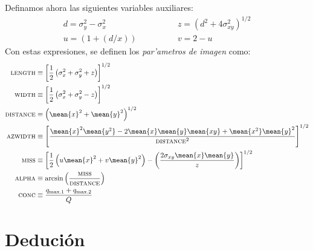 Definamos ahora las siguientes variables auxiliares:
%
\begin{equation}
\label{eq:auxiliary}
\begin{split}
  d = \sigma_y^2 - \sigma_x^2 &\qquad\qquad
  z = \left(d^2+4\sigma_{xy}^2\right)^{1/2} \\
  u = \left(1+(d/x)\right) &\qquad\qquad
  v = 2 - u
\end{split}
\end{equation}
Con estas expresiones, se definen los \emph{par'ametros de imagen}
como:
%
\begin{subequations}
  \label{eq:imageparams}
  \begin{align}
%
    \label{eq:lengthdef}
    \text{\scshape length} &\equiv 
    \left[\frac{1}{2}\left(\sigma_x^2+\sigma_y^2+z\right)\right]^{1/2}\\
%
    \label{eq:widthdef}
    \text{\scshape width} &\equiv 
    \left[\frac{1}{2}\left(\sigma_x^2+\sigma_y^2-z\right)\right]^{1/2}\\
%
    \label{eq:distdef}
    \text{\scshape distance} &\equiv 
    \left(\mean{x}^2 + \mean{y}^2\right)^{1/2}\\
%
    \label{eq:azwidthdef}
    \text{\scshape azwidth} &\equiv 
    \left[\frac{\mean{x}^2\mean{y^2} 
        - 2\mean{x}\mean{y}\mean{xy} 
        + \mean{x^2}\mean{y}^2}{\text{\scshape distance}^2}\right]^{1/2}\\
%
    \label{eq:missdef}
    \text{\scshape miss} &\equiv 
    \left[\frac{1}{2}\left(u\mean{x}^2 + v\mean{y}^2\right)
        - \left(\frac{2\sigma_{xy}\mean{x}\mean{y}}{z}\right)\right]^{1/2}\\
%
    \label{eq:alphadef}
    \text{\scshape alpha} &\equiv
    \arcsin\left(\frac{\text{\scshape miss}}{\text{\scshape distance}}\right)\\
%
    \label{eq:concdef}
    \text{\scshape conc} &\equiv
    \frac{q_{\mathrm{max.1}} + q_{\mathrm{max.2}}}{Q}
%
  \end{align}
\end{subequations}

\imageparaxesfig


\section{Deduci\'on}%

